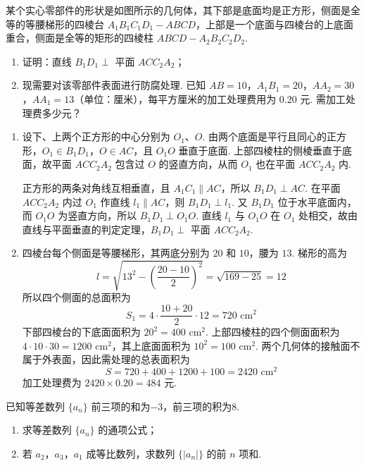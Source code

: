 \begin{problem}
某个实心零部件的形状是如图所示的几何体，其下部是底面均是正方形，侧面是全等的等腰梯形的四棱台 \(A_{1}B_{1}C_{1}D_{1} - ABCD\)，上部是一个底面与四棱台的上底面重合，侧面是全等的矩形的四棱柱 \(ABCD - A_{2}B_{2}C_{2}D_{2}\).
\begin{enumerate}
\item 证明：直线 \(B_{1}D_{1} \perp\) 平面 \(ACC_{2}A_{2}\)；
\item 现需要对该零部件表面进行防腐处理. 已知 \(AB = 10\)，\(A_{1}B_{1} = 20\)，\(AA_{2} = 30\)，\(AA_{1} = 13\)（单位：厘米），每平方厘米的加工处理费用为 \(0.20\text{ 元}\). 需加工处理费多少元？
\end{enumerate}

\end{problem}

\begin{solution}
\begin{enumerate}
\item 设下、上两个正方形的中心分别为 \(O_{1}\)、\(O\). 由两个底面是平行且同心的正方形，\(O_{1}\in B_{1}D_{1}\)，\(O\in AC\)，且 \(O_{1}O\) 垂直于底面. 上部四棱柱的侧棱垂直于底面，故平面 \(ACC_{2}A_{2}\) 包含过 \(O\) 的竖直方向，从而 \(O_{1}\) 也在平面 \(ACC_{2}A_{2}\) 内.

正方形的两条对角线互相垂直，且 \(A_{1}C_{1}\parallel AC\)，所以 \(B_{1}D_{1}\perp AC\). 在平面 \(ACC_{2}A_{2}\) 内过 \(O_{1}\) 作直线 \(l_{1}\parallel AC\)，则 \(B_{1}D_{1}\perp l_{1}\). 又 \(B_{1}D_{1}\) 位于水平底面内，而 \(O_{1}O\) 为竖直方向，所以 \(B_{1}D_{1}\perp O_{1}O\). 直线 \(l_{1}\) 与 \(O_{1}O\) 在 \(O_{1}\) 处相交，故由直线与平面垂直的判定定理，\(B_{1}D_{1}\perp\) 平面 \(ACC_{2}A_{2}\).

\item 四棱台每个侧面是等腰梯形，其两底分别为 \(20\) 和 \(10\)，腰为 \(13\). 梯形的高为
\[
l=\sqrt{13^{2}-\left(\frac{20-10}{2}\right)^{2}}=\sqrt{169-25}=12
\]
所以四个侧面的总面积为
\[
S_{1}=4\cdot\frac{10+20}{2}\cdot12=720\text{ cm}^{2}
\]
下部四棱台的下底面面积为 \(20^{2}=400\text{ cm}^{2}\). 上部四棱柱的四个侧面面积为 \(4\cdot10\cdot30=1200\text{ cm}^{2}\)，其上底面面积为 \(10^{2}=100\text{ cm}^{2}\). 两个几何体的接触面不属于外表面，因此需处理的总表面积为
\[
S=720+400+1200+100=2420\text{ cm}^{2}
\]
加工处理费为 \(2420\times0.20=484\) 元.
\end{enumerate}
\end{solution}

\begin{problem}
已知等差数列 \(\{a_{n}\}\) 前三项的和为\(-3\)，前三项的积为8.
\begin{enumerate}
\item 求等差数列 \( \{a_{n}\} \) 的通项公式；
\item 若 \(a_{2}\)，\(a_{3}\)，\(a_{1}\) 成等比数列，求数列 \(\{|a_{n}|\}\) 的前 \(n\) 项和.
\end{enumerate}
\end{problem}

